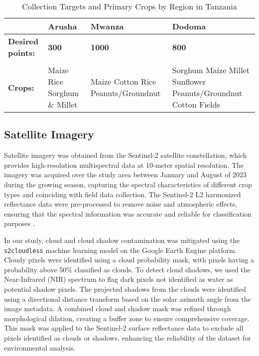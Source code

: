 \documentclass[journal]{IEEEtran}
\begin{document}
\begin{table} 
\centering
\begin{tabular}{@{}lp{1cm}p{2cm}p{2cm}@{}}
\toprule
& \textbf{Arusha} & \textbf{Mwanza} & \textbf{Dodoma} \\ \midrule
\textbf{Desired points:} & \textbf{300} & \textbf{1000} & \textbf{800} \\ 
\midrule \\
\textbf{Crops:} & Maize \newline Rice \newline Sorghum \& Millet 
               & Maize \newline Cotton \newline Rice \newline Peanuts/Groundnut 
               & Sorghum \newline Maize \newline Millet \newline Sunflower \newline Peanuts/Groundnut \newline Cotton Fields \\ 
\bottomrule
\end{tabular}
\caption{Collection Targets and Primary Crops by Region in Tanzania}
\label{tab:data_n}
\end{table} 

\subsection{Satellite Imagery}

Satellite imagery was obtained from the Sentinel-2 satellite constellation, which provides high-resolution multispectral data at 10-meter spatial resolution. The imagery was acquired over the study area  between January and August of 2023 during the growing season, capturing the spectral characteristics of different crop types and coinciding with field data collection. The Sentinel-2 L2 harmonized reflectance data were pre-processed to remove noise and atmospheric effects, ensuring that the spectral information was accurate and reliable for classification purposes \cite{begue2018remote}.

In our study, cloud and cloud shadow contamination was mitigated using the \texttt{s2cloudless} machine learning model on the Google Earth Engine platform. Cloudy pixels were identified using a cloud probability mask, with pixels having a probability above 50\% classified as clouds. To detect cloud shadows, we used the Near-Infrared (NIR) spectrum to flag dark pixels not identified as water as potential shadow pixels. The projected shadows from the clouds were identified using a directional distance transform based on the solar azimuth angle from the image metadata. A combined cloud and shadow mask was refined through morphological dilation, creating a buffer zone to ensure comprehensive coverage. This mask was applied to the Sentinel-2 surface reflectance data to exclude all pixels identified as clouds or shadows, enhancing the reliability of the dataset for environmental analysis.
\end{document}
